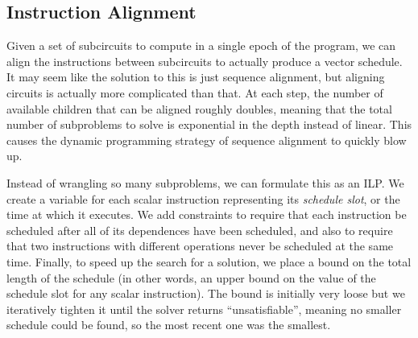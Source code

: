 \subsection{Instruction Alignment}\label{sec:instruction-alignment}
Given a set of subcircuits to compute in a single epoch of the program, we can align the instructions between subcircuits to actually produce a vector schedule.
It may seem like the solution to this is just sequence alignment, but aligning circuits is actually more complicated than that.
At each step, the number of available children that can be aligned roughly doubles, meaning that the total number of subproblems to solve is exponential in the depth instead of linear. 
This causes the dynamic programming strategy of sequence alignment to quickly blow up.

Instead of wrangling so many subproblems, we can formulate this as an ILP.
We create a variable for each scalar instruction representing its {\em schedule slot}, or the time at which it executes.
We add constraints to require that each instruction be scheduled after all of its dependences have been scheduled, and also to require that two instructions with different operations never be scheduled at the same time. 
Finally, to speed up the search for a solution, we place a bound on the total length of the schedule (in other words, an upper bound on the value of the schedule slot for any scalar instruction).
The bound is initially very loose but we iteratively tighten it until the solver returns ``unsatisfiable'', meaning no smaller schedule could be found, so the most recent one was the smallest.

